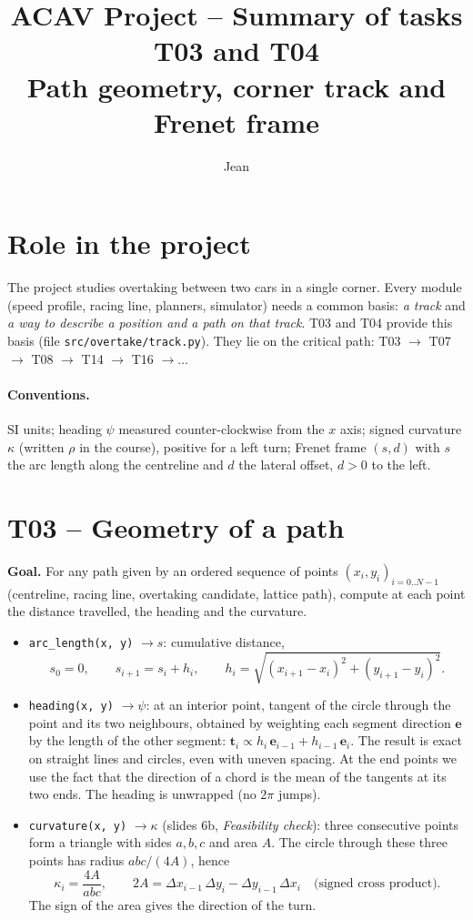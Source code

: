 \documentclass[11pt,a4paper]{article}
\title{ACAV Project -- Summary of tasks T03 and T04\\[2pt]
\large Path geometry, corner track and Frenet frame}
\author{Jean}
\date{}
\newcommand{\code}[1]{\texttt{#1}}
\begin{document}
\maketitle

\section{Role in the project}
The project studies overtaking between two cars in a single corner. Every module (speed
profile, racing line, planners, simulator) needs a common basis: \emph{a track} and \emph{a way
to describe a position and a path on that track}. T03 and T04 provide this basis (file
\code{src/overtake/track.py}). They lie on the critical path: T03 $\to$ T07 $\to$ T08 $\to$
T14 $\to$ T16 $\to \dots$

\paragraph{Conventions.} SI units; heading $\psi$ measured counter-clockwise from the $x$ axis;
signed curvature $\kappa$ (written $\rho$ in the course), positive for a left turn; Frenet frame
$(s,d)$ with $s$ the arc length along the centreline and $d$ the lateral offset, $d>0$ to the
left.

\section{T03 -- Geometry of a path}
\textbf{Goal.} For any path given by an ordered sequence of points $(x_i,y_i)_{i=0..N-1}$
(centreline, racing line, overtaking candidate, lattice path), compute at each point the
distance travelled, the heading and the curvature.

\begin{itemize}
  \item \code{arc\_length(x, y)} $\to s$: cumulative distance,
  \[ s_0 = 0, \qquad s_{i+1} = s_i + h_i, \qquad h_i = \sqrt{(x_{i+1}-x_i)^2 + (y_{i+1}-y_i)^2}. \]
  \item \code{heading(x, y)} $\to \psi$: at an interior point, tangent of the circle through
  the point and its two neighbours, obtained by weighting each segment direction $\mathbf{e}$
  by the length of the other segment:
  $\mathbf{t}_i \propto h_i\,\mathbf{e}_{i-1} + h_{i-1}\,\mathbf{e}_i$.
  The result is exact on straight lines and circles, even with uneven spacing. At the end
  points we use the fact that the direction of a chord is the mean of the tangents at its two
  ends. The heading is unwrapped (no $2\pi$ jumps).
  \item \code{curvature(x, y)} $\to \kappa$ (slides 6b, \emph{Feasibility check}): three
  consecutive points form a triangle with sides $a,b,c$ and area $A$. The circle through these
  three points has radius $abc/(4A)$, hence
  \[ \kappa_i = \frac{4A}{abc}, \qquad 2A = \Delta x_{i-1}\,\Delta y_i - \Delta y_{i-1}\,\Delta x_i
     \quad \text{(signed cross product).} \]
  The sign of the area gives the direction of the turn.
\end{itemize}
\end{document}
